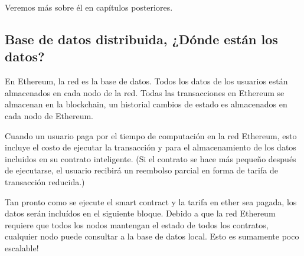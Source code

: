 Veremos más sobre él en capítulos posteriores.

\subsection{Base de datos distribuida, ¿Dónde están los datos?}
En Ethereum, la red es la base de datos. Todos los datos de los usuarios están almacenados en 
cada nodo de la red. Todas las transacciones en Ethereum se almacenan en la blockchain, un
historial cambios de estado es almacenados en cada nodo de Ethereum.

Cuando un usuario paga por el tiempo de computación en la red Ethereum, esto incluye el costo
de ejecutar la transacción y para el almacenamiento de los datos incluidos en su contrato
inteligente. (Si el contrato se hace más pequeño después de ejecutarse, el usuario recibirá un
reembolso parcial en forma de tarifa de transacción reducida.)

Tan pronto como se ejecute el smart contract y la tarifa en ether sea pagada, los datos serán
incluídos en el siguiente bloque. Debido a que la red Ethereum requiere que todos los nodos
mantengan el estado de todos los contratos, cualquier nodo puede consultar a la base de datos
local. Esto es sumamente poco escalable!


